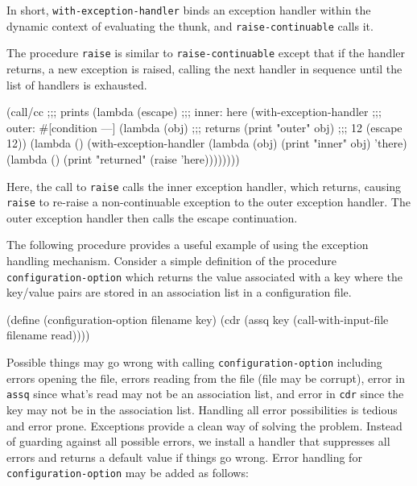 \documentclass[onecolumn, 12pt, twoside, openright, dvipdfm]{book}
\begin{document}
In short, \texttt{with-exception-handler} binds an exception handler
within the dynamic context of evaluating the thunk, and
\texttt{raise-continuable} calls it.

The procedure \texttt{raise} is similar to
\texttt{raise-continuable} except that if the handler returns, a new
exception is raised, calling the next handler in sequence until the
list of handlers is exhausted.

\begin{CodeInline}
(call/cc                          ;;; prints
  (lambda (escape)                ;;;   inner: here
    (with-exception-handler       ;;;   outer: #[condition ---]
      (lambda (obj)               ;;; returns
        (print "outer" obj)       ;;;   12
        (escape 12))
      (lambda ()                            
        (with-exception-handler            
          (lambda (obj)
            (print "inner" obj)
            'there)
          (lambda ()
            (print "returned" (raise 'here))))))))
\end{CodeInline}

Here, the call to \texttt{raise} calls the inner exception handler,
which returns, causing \texttt{raise} to re-raise a non-continuable 
exception to the outer exception handler.  The outer exception
handler then calls the escape continuation.

The following procedure provides a useful example of using the
exception handling mechanism.  Consider a simple definition of the
procedure \texttt{configuration-option} which returns the value
associated with a key where the key/value pairs are stored in an
association list in a configuration file.

\begin{CodeInline}
(define (configuration-option filename key)
  (cdr (assq key (call-with-input-file filename read))))
\end{CodeInline}

Possible things may go wrong with calling
\texttt{configuration-option} including errors opening the file,
errors reading from the file (file may be corrupt), error in
\texttt{assq} since what's read may not be an association list, and
error in \texttt{cdr} since the key may not be in the association
list.  Handling all error possibilities is tedious and error prone.  
Exceptions provide a clean way of solving the problem.  Instead of
guarding against all possible errors, we install a handler that
suppresses all errors and returns a default value if things go
wrong.  Error handling for \texttt{configuration-option} may be
added as follows:
\end{document}
